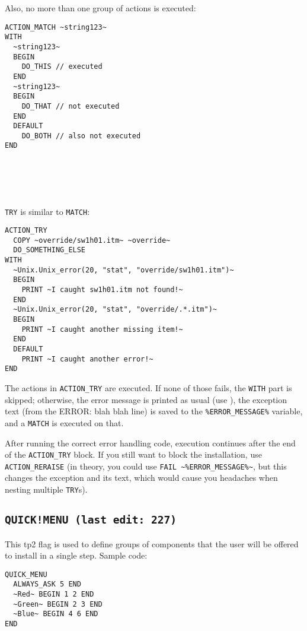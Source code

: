 \documentclass{article}
\def\ttref#1{\ahrefloc{#1}{\tt #1}}
\begin{document}
Also, no more than one group of actions is executed:
\begin{verbatim}
ACTION_MATCH ~string123~
WITH
  ~string123~
  BEGIN
    DO_THIS // executed
  END
  ~string123~
  BEGIN
    DO_THAT // not executed
  END
  DEFAULT
    DO_BOTH // also not executed
END
\end{verbatim}
\\
\\
\\
\\
\verb+TRY+ is similar to \verb+MATCH+:
\begin{verbatim}
ACTION_TRY
  COPY ~override/sw1h01.itm~ ~override~
  DO_SOMETHING_ELSE
WITH
  ~Unix.Unix_error(20, "stat", "override/sw1h01.itm")~
  BEGIN
    PRINT ~I caught sw1h01.itm not found!~
  END
  ~Unix.Unix_error(20, "stat", "override/.*.itm")~
  BEGIN
    PRINT ~I caught another missing item!~
  END
  DEFAULT
    PRINT ~I caught another error!~
END
\end{verbatim}

The actions in \verb+ACTION_TRY+ are executed. If none of those fails, the
\verb+WITH+ part is skipped; otherwise, the error message is printed as usual
(use \ttref{SILENT}), the exception text (from the ERROR: blah blah line) is
saved to the \verb+%ERROR_MESSAGE%+ variable, and a \verb+MATCH+ is executed
on that.

After running the correct error handling code, execution continues after the
end of the \verb+ACTION_TRY+ block. If you still want to block the
installation, use \verb+ACTION_RERAISE+ (in theory, you could use
\verb+FAIL ~%ERROR_MESSAGE%~+, but this changes the exception and its text,
which would cause you headaches when nesting multiple \verb+TRY+s).



\label{sec-quick-menu}\subsection{\tt{QUICK!MENU} (last edit: 227)}

This tp2 flag is used to define groups of components that the user will be
offered to install in a single step. Sample code:

\begin{verbatim}
QUICK_MENU
  ALWAYS_ASK 5 END
  ~Red~ BEGIN 1 2 END
  ~Green~ BEGIN 2 3 END
  ~Blue~ BEGIN 4 6 END
END
\end{verbatim}
\end{document}
